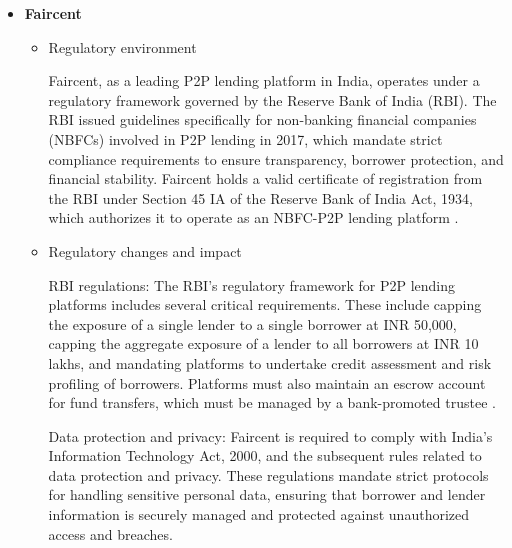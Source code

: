 \documentclass{article}
\begin{document}
\begin{itemize}
\begin{itemize}
        Periodic audits and reporting: The platform undergoes regular audits to ensure compliance with regulatory standards. These audits are conducted by external auditors and are part of the platform's commitment to transparency and accountability. Bondora’s consolidated financial statements are audited annually by reputable firms, providing an additional layer of security and trust for investors.
        
        Regulatory adaptations: Over the years, Bondora has had to adapt to changes in the regulatory landscape. For instance, the introduction of new EU regulations on data protection and financial reporting has required the platform to enhance its data management systems and reporting processes to ensure full compliance.

    \end{itemize}
      
   \item \textbf{Faircent}
    \begin{itemize}
        \item Regulatory environment

        Faircent, as a leading P2P lending platform in India, operates under a regulatory framework governed by the Reserve Bank of India (RBI). The RBI issued guidelines specifically for non-banking financial companies (NBFCs) involved in P2P lending in 2017, which mandate strict compliance requirements to ensure transparency, borrower protection, and financial stability. Faircent holds a valid certificate of registration from the RBI under Section 45 IA of the Reserve Bank of India Act, 1934, which authorizes it to operate as an NBFC-P2P lending platform \citep{rbi_non-banking_2017}.

        \item Regulatory changes and impact

        RBI regulations: The RBI's regulatory framework for P2P lending platforms includes several critical requirements. These include capping the exposure of a single lender to a single borrower at INR 50,000, capping the aggregate exposure of a lender to all borrowers at INR 10 lakhs, and mandating platforms to undertake credit assessment and risk profiling of borrowers. Platforms must also maintain an escrow account for fund transfers, which must be managed by a bank-promoted trustee \citep{rbi_non-banking_2017}.
        
        Data protection and privacy: Faircent is required to comply with India's Information Technology Act, 2000, and the subsequent rules related to data protection and privacy. These regulations mandate strict protocols for handling sensitive personal data, ensuring that borrower and lender information is securely managed and protected against unauthorized access and breaches.
        

\end{itemize}
\end{itemize}
\end{document}
